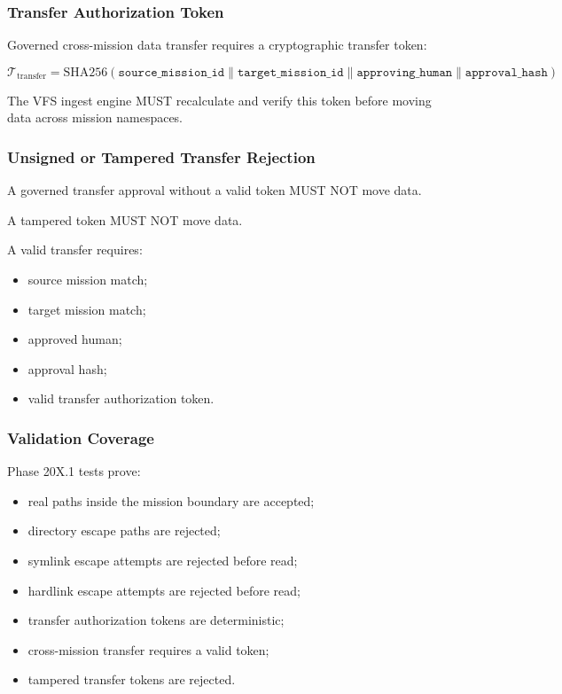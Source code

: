 \subsubsection{Transfer Authorization Token}

Governed cross-mission data transfer requires a cryptographic transfer token:

\begin{equation}
\mathcal{T}_{\mathrm{transfer}}
=
\mathrm{SHA256}
(
\mathtt{source\_mission\_id}
\parallel
\mathtt{target\_mission\_id}
\parallel
\mathtt{approving\_human}
\parallel
\mathtt{approval\_hash}
)
\end{equation}

The VFS ingest engine MUST recalculate and verify this token before moving data across mission namespaces.

\subsubsection{Unsigned or Tampered Transfer Rejection}

A governed transfer approval without a valid token MUST NOT move data.

A tampered token MUST NOT move data.

A valid transfer requires:

\begin{itemize}
  \item source mission match;
  \item target mission match;
  \item approved human;
  \item approval hash;
  \item valid transfer authorization token.
\end{itemize}

\subsubsection{Validation Coverage}

Phase 20X.1 tests prove:

\begin{itemize}
  \item real paths inside the mission boundary are accepted;
  \item directory escape paths are rejected;
  \item symlink escape attempts are rejected before read;
  \item hardlink escape attempts are rejected before read;
  \item transfer authorization tokens are deterministic;
  \item cross-mission transfer requires a valid token;
  \item tampered transfer tokens are rejected.
\end{itemize}

